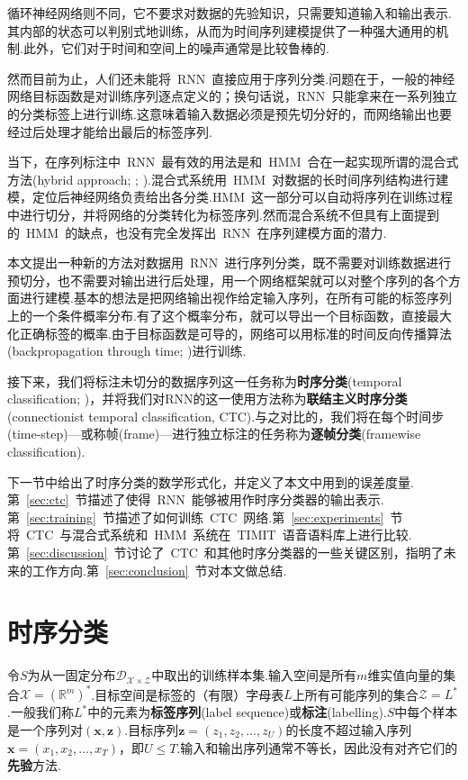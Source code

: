 \documentclass{ctexart}
\def\bR{\mathbb{R}}
\def\cD{\mathcal{D}}
\def\cX{\mathcal{X}}
\def\cZ{\mathcal{Z}}
\def\vx{\mathbf{x}}
\def\vz{\mathbf{z}}
\begin{document}
循环神经网络则不同，它不要求对数据的先验知识，只需要知道输入和输出表示.其内部的状态可以判别式地训练，从而为时间序列建模提供了一种强大通用的机制.此外，它们对于时间和空间上的噪声通常是比较鲁棒的.

然而目前为止，人们还未能将~RNN~直接应用于序列分类.问题在于，一般的神经网络目标函数是对训练序列逐点定义的；换句话说，RNN~只能拿来在一系列独立的分类标签上进行训练.这意味着输入数据必须是预先切分好的，而网络输出也要经过后处理才能给出最后的标签序列.

当下，在序列标注中~RNN~最有效的用法是和~HMM~合在一起实现所谓的混合式方法(hybrid approach; \citealp{bourlard1994connectionist}; \citealp{bengio1999markovian}).混合式系统用~HMM~对数据的长时间序列结构进行建模，定位后神经网络负责给出各分类.HMM~这一部分可以自动将序列在训练过程中进行切分，并将网络的分类转化为标签序列.然而混合系统不但具有上面提到的~HMM~的缺点，也没有完全发挥出~RNN~在序列建模方面的潜力.

本文提出一种新的方法对数据用~RNN~进行序列分类，既不需要对训练数据进行预切分，也不需要对输出进行后处理，用一个网络框架就可以对整个序列的各个方面进行建模.基本的想法是把网络输出视作给定输入序列，在所有可能的标签序列上的一个条件概率分布.有了这个概率分布，就可以导出一个目标函数，直接最大化正确标签的概率.由于目标函数是可导的，网络可以用标准的时间反向传播算法(backpropagation through time; \citealp{werbos1990bptt})进行训练.

接下来，我们将标注未切分的数据序列这一任务称为\textbf{时序分类}(temporal classification; \citealp{kadous2002temporal})，并将我们对RNN的这一使用方法称为\textbf{联结主义时序分类}(connectionist temporal classification, CTC).与之对比的，我们将在每个时间步(time-step)---或称帧(frame)---进行独立标注的任务称为\textbf{逐帧分类}(framewise classification).

下一节中给出了时序分类的数学形式化，并定义了本文中用到的误差度量.第~\ref{sec:ctc}~节描述了使得~RNN~能够被用作时序分类器的输出表示.第~\ref{sec:training}~节描述了如何训练~CTC~网络.第~\ref{sec:experiments}~节将~CTC~与混合式系统和~HMM~系统在~TIMIT~语音语料库上进行比较.第~\ref{sec:discussion}~节讨论了~CTC~和其他时序分类器的一些关键区别，指明了未来的工作方向.第~\ref{sec:conclusion}~节对本文做总结.
\section{时序分类}
令$S$为从一固定分布$\cD_{\cX\times\cZ}$中取出的训练样本集.输入空间是所有$m$维实值向量的集合$\cX = (\bR^m)^*$.目标空间是标签的（有限）字母表$L$上所有可能序列的集合$\cZ = L^*$.一般我们称$L^*$中的元素为\textbf{标签序列}(label sequence)或\textbf{标注}(labelling).$S$中每个样本是一个序列对$(\vx, \vz)$.目标序列$\vz = (z_1,z_2,\dots, z_U)$的长度不超过输入序列$\vx = (x_1,x_2,\dots,x_T)$，即$U\le T$.输入和输出序列通常不等长，因此没有对齐它们的\textbf{先验}方法.
\end{document}
